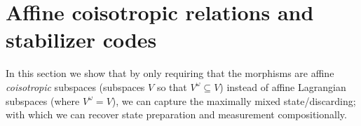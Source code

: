 



\section{Affine coisotropic relations and stabilizer codes}
\label{sec:coisotrel}
\label{sec:coisot}


In this section we show that by only requiring that the morphisms are affine {\em coisotropic} subspaces   (subspaces $V$ so that $V^\omega \subseteq V$) instead of affine Lagrangian subspaces (where $V^\omega= V$), we can capture the maximally mixed state/discarding; with which we can recover state preparation and measurement compositionally.


